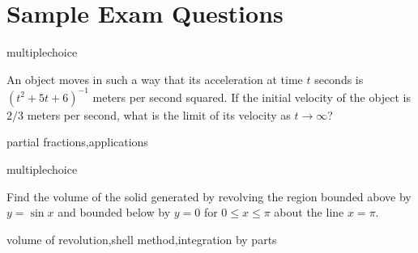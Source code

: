 \documentclass{ximera}
\begin{document}
\section*{Sample Exam Questions}

\begin{question}[2015C.09]
\begin{type}
multiplechoice
\end{type}
An object moves in such a way that its acceleration at time \(t\) seconds is \((t^2 + 5t + 6)^{-1}\) meters per second squared. If the initial velocity of the object is \(2/3\) meters per second, what is the limit of its velocity as \(t \rightarrow \infty\)?
\begin{multiplechoice}
\end{multiplechoice}
\begin{keywords}
partial fractions,applications
\end{keywords}
\end{question}

\begin{question}[2017C.01]
\begin{type}
multiplechoice
\end{type}
Find the volume of the solid generated by revolving the region bounded above by \(y = \sin x\) and bounded below by \(y = 0\) for \(0 \leq x \leq \pi\) about the line \(x = \pi\).
\begin{multiplechoice}
\end{multiplechoice}
\begin{keywords}
volume of revolution,shell method,integration by parts
\end{keywords}
\end{question}
\end{document}
